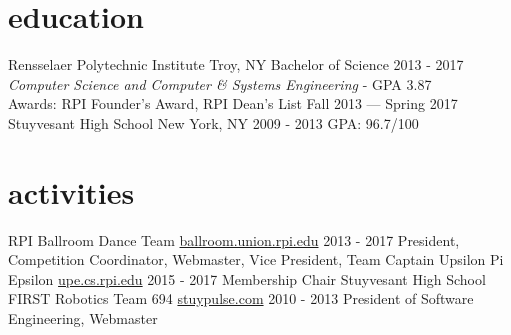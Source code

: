 \documentclass[]{friggeri-cv}
\begin{document}
\section{education}

\begin{entrylist}
  \entryheader
    {Rensselaer Polytechnic Institute}
    {Troy, NY}
  \entry
    {Bachelor of Science}
    {2013 - 2017}
    {\vspace{10pt}\emph{Computer Science and Computer \& Systems Engineering} - GPA 3.87\\
    Awards: RPI Founder's Award, RPI Dean's List Fall 2013 --- Spring 2017}
  \entryheader
    {Stuyvesant High School}
    {New York, NY}
  \entry
    {}
    {2009 - 2013}
    {GPA: 96.7/100}
\end{entrylist}

\section{activities}

\begin{entrylist}
  \entryheader
    {RPI Ballroom Dance Team}
    {\href{https://ballroom.union.rpi.edu}{ballroom.union.rpi.edu} 2013 - 2017}
  \entrynoheader
    {President, Competition Coordinator, Webmaster, Vice President, Team Captain}
  \entryheader
    {Upsilon Pi Epsilon}
    {\href{https://upe.cs.rpi.edu}{upe.cs.rpi.edu} 2015 - 2017}
  \entrynoheader
    {Membership Chair}
  \entryheader
    {Stuyvesant High School FIRST Robotics Team 694}
    {\href{https://stuypulse.com}{stuypulse.com} 2010 - 2013}
  \entrynoheader
    {President of Software Engineering, Webmaster}
\end{entrylist}
\end{document}
